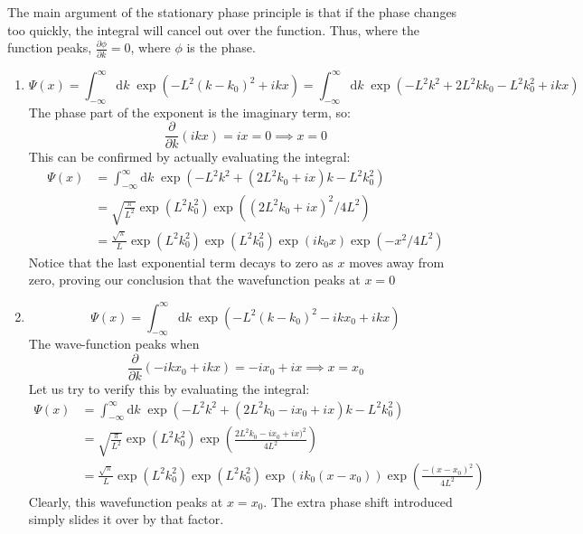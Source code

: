 \begin{sol}
The main argument of the stationary phase principle is that if the phase changes too quickly, the integral will cancel out over the function. Thus, where the function peaks, $\frac{\partial \phi}{\partial k} = 0$, where $\phi$ is the phase.
\begin{enumerate}[label=\textbf{(\alph*)}]
\item $$\Psi(x) = \int_{-\infty}^{\infty}\mathrm{d}k\;\exp(-L^2(k - k_0)^2 + ikx)  = \int_{-\infty}^{\infty}\mathrm{d}k\;\exp(-L^2k^2 + 2L^2kk_0 - L^2k_0^2 + ikx)$$The phase part of the exponent is the imaginary term, so:
$$\frac{\partial}{\partial k}(ikx) = ix = 0 \implies x = 0$$This can be confirmed by actually evaluating the integral:
\begin{align*}
\Psi(x) &= \int_{-\infty}^{\infty}\mathrm{d}k\;\exp(-L^2k^2 + (2L^2k_0 + ix)k- L^2k_0^2) \\
&= \sqrt{\frac{\pi}{L^2}}\exp(L^2k_0^2)\exp((2L^2k_0 + ix)^2/4L^2) \\
&= \frac{\sqrt{\pi}}{L}\exp(L^2k_0^2)\exp(L^2k_0^2)\exp(ik_0x)\exp(-x^2/4L^2)
\end{align*}
Notice that the last exponential term decays to zero as $x$ moves away from zero, proving our conclusion that the wavefunction peaks at $x = 0$

\item $$\Psi(x) = \int_{-\infty}^{\infty}\mathrm{d}k\;\exp(-L^2(k - k_0)^2-ikx_0+ikx)$$
The wave-function peaks when
$$\frac{\partial}{\partial k}(-ikx_0+ikx) = -ix_0+ix \implies x = x_0$$
Let us try to verify this by evaluating the integral:
\begin{align*}
\Psi(x) &= \int_{-\infty}^{\infty}\mathrm{d}k\;\exp(-L^2k^2 + (2L^2k_0 - ix_0 + ix)k - L^2k_0^2) \\
&= \sqrt{\frac{\pi}{L^2}}\exp(L^2k_0^2)\exp\left(\frac{2L^2k_0 -ix_0+ix)^2}{4L^2}\right) \\
&= \frac{\sqrt{\pi}}{L}\exp(L^2k_0^2)\exp(L^2k_0^2)\exp(ik_0(x-x_0))\exp\left(\frac{-(x-x_0)^2}{4L^2}\right)
\end{align*}
Clearly, this wavefunction peaks at $x=x_0$. The extra phase shift introduced simply slides it over by that factor. 
\end{enumerate}
\end{sol}